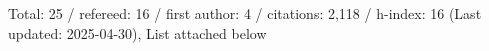 Total: 25 / refereed: 16 / first author: 4 / citations: 2,118 / h-index: 16 (Last updated: 2025-04-30), List attached below